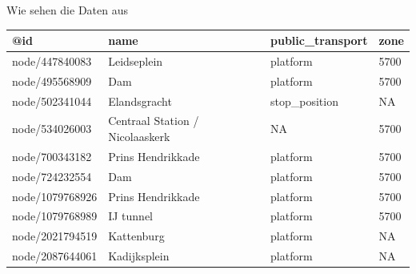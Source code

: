 \documentclass[ignorenonframetext,]{beamer}
\newenvironment{Shaded}{\begin{snugshade}}{\end{snugshade}}
\newcommand{\KeywordTok}[1]{\textcolor[rgb]{0.13,0.29,0.53}{\textbf{#1}}}
\newcommand{\DecValTok}[1]{\textcolor[rgb]{0.00,0.00,0.81}{#1}}
\newcommand{\OperatorTok}[1]{\textcolor[rgb]{0.81,0.36,0.00}{\textbf{#1}}}
\newcommand{\NormalTok}[1]{#1}
\begin{document}
\begin{frame}[fragile]{Wie sehen die Daten aus}

\begin{Shaded}
\end{Shaded}

\begin{longtable}[]{@{}llll@{}}
\toprule
@id & name & public\_transport & zone\tabularnewline
\midrule
\endhead
node/447840083 & Leidseplein & platform & 5700\tabularnewline
node/495568909 & Dam & platform & 5700\tabularnewline
node/502341044 & Elandsgracht & stop\_position & NA\tabularnewline
node/534026003 & Centraal Station / Nicolaaskerk & NA &
5700\tabularnewline
node/700343182 & Prins Hendrikkade & platform & 5700\tabularnewline
node/724232554 & Dam & platform & 5700\tabularnewline
node/1079768926 & Prins Hendrikkade & platform & 5700\tabularnewline
node/1079768989 & IJ tunnel & platform & 5700\tabularnewline
node/2021794519 & Kattenburg & platform & NA\tabularnewline
node/2087644061 & Kadijksplein & platform & NA\tabularnewline
\bottomrule
\end{longtable}

\end{frame}
\end{document}
